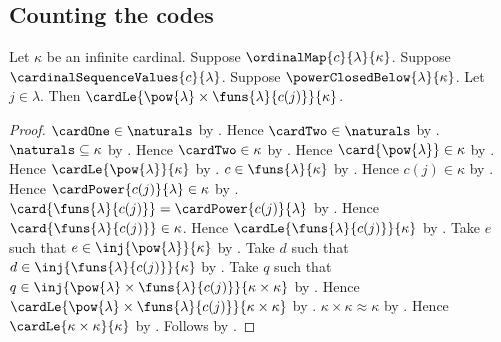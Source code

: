 \subsection{Counting the codes}

\begin{theorem}\label{silver_code_fibre_cardinal_bound}
    Let $\kappa$ be an infinite cardinal.
    Suppose $\ordinalMap{c}{\lambda}{\kappa}$.
    Suppose $\cardinalSequenceValues{c}{\lambda}$.
    Suppose $\powerClosedBelow{\lambda}{\kappa}$.
    Let $j\in\lambda$.
    Then $\cardLe{\pow{\lambda}\times\funs{\lambda}{c(j)}}{\kappa}$.
\end{theorem}
\begin{proof}
    $\cardOne\in\naturals$
        by .
    Hence $\cardTwo\in\naturals$
        by .
    $\naturals\subseteq\kappa$
        by .
    Hence $\cardTwo\in\kappa$ by .
    Hence $\card{\pow{\lambda}}\in\kappa$
        by .
    Hence $\cardLe{\pow{\lambda}}{\kappa}$
        by .
    $c\in\funs{\lambda}{\kappa}$ by .
    Hence $c(j)\in\kappa$ by .
    Hence $\cardPower{c(j)}{\lambda}\in\kappa$
        by .
    $\card{\funs{\lambda}{c(j)}}=\cardPower{c(j)}{\lambda}$
        by .
    Hence $\card{\funs{\lambda}{c(j)}}\in\kappa$.
    Hence $\cardLe{\funs{\lambda}{c(j)}}{\kappa}$
        by .
    Take $e$ such that $e\in\inj{\pow{\lambda}}{\kappa}$
        by .
    Take $d$ such that $d\in\inj{\funs{\lambda}{c(j)}}{\kappa}$
        by .
    Take $q$ such that
        $q\in\inj{\pow{\lambda}\times\funs{\lambda}{c(j)}}
            {\kappa\times\kappa}$
        by .
    Hence $\cardLe{\pow{\lambda}\times\funs{\lambda}{c(j)}}
        {\kappa\times\kappa}$ by .
    $\kappa\times\kappa\approx\kappa$
        by .
    Hence $\cardLe{\kappa\times\kappa}{\kappa}$
        by .
    Follows by .
\end{proof}

